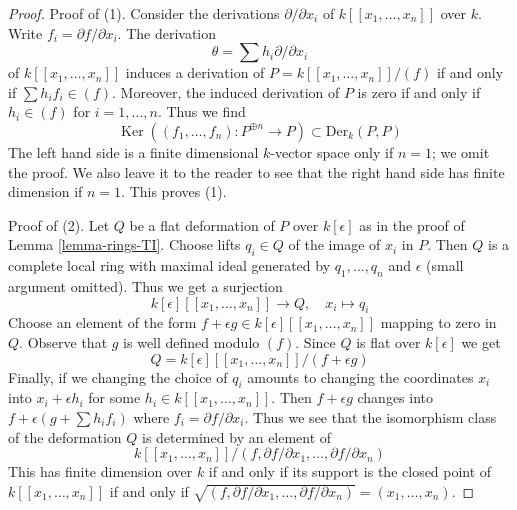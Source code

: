 \documentclass[10pt,a4paper]{amsart}
\theoremstyle{plain}
\theoremstyle{definition}
\theoremstyle{remark}
\numberwithin{equation}{subsection}
\def\Ker{\mathop{\mathrm{Ker}}}
\begin{document}
\begin{proof}
Proof of (1). Consider the derivations $\partial/\partial x_i$ of
$k[[x_1, \ldots, x_n]]$ over $k$. Write $f_i = \partial f/\partial x_i$.
The derivation
$$
\theta = \sum h_i \partial/\partial x_i
$$
of $k[[x_1, \ldots, x_n]]$
induces a derivation of $P = k[[x_1, \ldots, x_n]]/(f)$
if and only if
$\sum h_i f_i \in (f)$. Moreover, the induced derivation of $P$
is zero if and only if $h_i \in (f)$ for $i = 1, \ldots, n$.
Thus we find
$$
\Ker((f_1, \ldots, f_n) : P^{\oplus n} \longrightarrow P) \subset
\text{Der}_k(P, P)
$$
The left hand side is a finite dimensional $k$-vector space only if
$n = 1$; we omit the proof. We also leave it to the reader to see
that the right hand side has finite dimension if $n = 1$.
This proves (1).

\medskip\noindent
Proof of (2). Let $Q$ be a flat deformation of $P$ over $k[\epsilon]$
as in the proof of Lemma \ref{lemma-rings-TI}. Choose lifts $q_i \in Q$
of the image of $x_i$ in $P$. Then $Q$ is a complete local ring
with maximal ideal generated by $q_1, \ldots, q_n$ and $\epsilon$
(small argument omitted). Thus we get a surjection
$$
k[\epsilon][[x_1, \ldots, x_n]] \longrightarrow Q,\quad
x_i \longmapsto q_i
$$
Choose an element of the form
$f + \epsilon g \in k[\epsilon][[x_1, \ldots, x_n]]$
mapping to zero in $Q$. Observe that $g$ is well defined modulo $(f)$.
Since $Q$ is flat over $k[\epsilon]$ we get
$$
Q = k[\epsilon][[x_1, \ldots, x_n]]/(f + \epsilon g)
$$
Finally, if we changing the choice of $q_i$ amounts to
changing the coordinates $x_i$ into $x_i + \epsilon h_i$
for some $h_i \in k[[x_1, \ldots, x_n]]$. Then
$f + \epsilon g$ changes into $f + \epsilon (g + \sum h_i f_i)$
where $f_i = \partial f/\partial x_i$. Thus we see that the
isomorphism class of the deformation $Q$ is determined
by an element of
$$
k[[x_1, \ldots, x_n]]/
(f, \partial f/\partial x_1, \ldots,  \partial f/\partial x_n)
$$
This has finite dimension over $k$ if and only if
its support is the closed point of $k[[x_1, \ldots, x_n]]$
if and only if
$\sqrt{(f, \partial f/\partial x_1, \ldots,  \partial f/\partial x_n)} =
(x_1, \ldots, x_n)$.
\end{proof}
\end{document}
